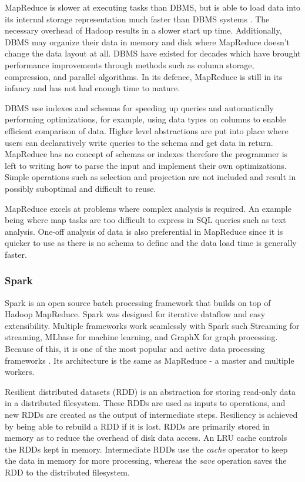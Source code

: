 \documentclass[12pt]{article}
\begin{document}
MapReduce is slower at executing tasks than DBMS, but is able to load data into its internal storage representation much faster than DBMS systems \cite{pavlo2009mapreduce}. The necessary overhead of Hadoop results in a slower start up time. Additionally, DBMS may organize their data in memory and disk where MapReduce doesn't change the data layout at all. DBMS have existed for decades which have brought performance improvements through methods such as column storage, compression, and parallel algorithms. In its defence, MapReduce is still in its infancy and has not had enough time to mature.

DBMS use indexes and schemas for speeding up queries and automatically performing optimizations, for example, using data types on columns to enable efficient comparison of data. Higher level abstractions are put into place where users can declaratively write queries to the schema and get data in return. MapReduce has no concept of schemas or indexes therefore the programmer is left to writing how to parse the input and implement their own optimizations. Simple operations such as selection and projection are not included and result in possibly suboptimal and difficult to reuse.

MapReduce excels at problems where complex analysis is required. An example being where map tasks are too difficult to express in SQL queries such as text analysis. One-off analysis of data is also preferential in MapReduce since it is quicker to use as there is no schema to define and the data load time is generally faster.


\subsubsection{Spark} \label{ssub:spark}

Spark \cite{zaharia2010spark} is an open source batch processing framework that builds on top of Hadoop MapReduce. Spark was designed for iterative dataflow and easy extensibility. Multiple frameworks work seamlessly with Spark such Streaming for streaming, MLbase for machine learning, and GraphX for graph processing. Because of this, it is one of the most popular and active data processing frameworks \cite{zhang2016survey}. Its architecture is the same as MapReduce - a master and multiple workers.

Resilient distributed datasets (RDD) is an abstraction for storing read-only data in a distributed filesystem. These RDDs are used as inputs to operations, and new RDDs are created as the output of intermediate steps. Resiliency is achieved by being able to rebuild a RDD if it is lost. RDDs are primarily stored in memory as to reduce the overhead of disk data access. An LRU cache controls the RDDs kept in memory. Intermediate RDDs use the \textit{cache} operator to keep the data in memory for more processing, whereas the \textit{save} operation saves the RDD to the distributed filesystem.
\end{document}
